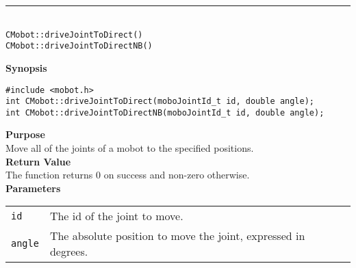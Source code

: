 \noindent
\vspace{5pt}
\rule{4.5in}{0.015in}\\
\noindent
{\LARGE \texttt{CMobot::driveJointToDirect()}}\\
{\LARGE \texttt{CMobot::driveJointToDirectNB()}}\\
{}

\noindent
{\bf Synopsis}
\vspace{-8pt}
\begin{verbatim}
#include <mobot.h>
int CMobot::driveJointToDirect(moboJointId_t id, double angle);
int CMobot::driveJointToDirectNB(moboJointId_t id, double angle);
\end{verbatim}

\noindent
{\bf Purpose}\\
Move all of the joints of a mobot to the specified positions.\\

\noindent
{\bf Return Value}\\
The function returns 0 on success and non-zero otherwise.\\

\noindent
{\bf Parameters}\\
\vspace{-0.1in}
\begin{description}
\item               
\begin{tabular}{p{15 mm}p{105 mm}}
\texttt{id} & The id of the joint to move. \\
\texttt{angle} & The absolute position to move the joint, expressed in degrees. \\
\end{tabular}
\end{description}
\noindent

